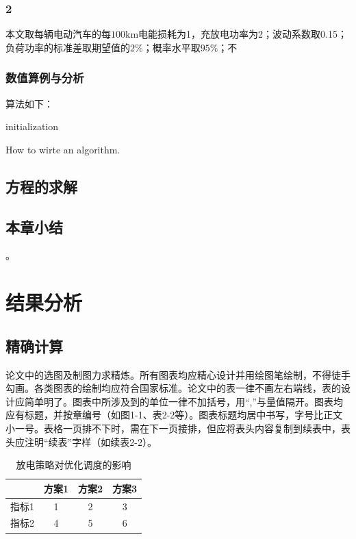 \documentclass[bachelor]{NCEPU-thesis}
\begin{document}
\subsection{2}
本文取每辆电动汽车的每$100$km电能损耗为1，充放电功率为2；波动系数取0.15；负荷功率的标准差取期望值的$2\%$；概率水平取$95\%$；不

\subsection{数值算例与分析}
算法如下：

\begin{algorithm}[H]
 initialization\;
 \caption{How to wirte an algorithm.}
\end{algorithm}


\section{方程的求解}

\section{本章小结}
。\chapter{结果分析}
\section{精确计算}

论文中的选图及制图力求精炼。所有图表均应精心设计并用绘图笔绘制，不得徒手勾画。各类图表的绘制均应符合国家标准。论文中的表一律不画左右端线，表的设计应简单明了。图表中所涉及到的单位一律不加括号，用“,”与量值隔开。图表均应有标题，并按章编号（如图1-1、表2-2等）。图表标题均居中书写，字号比正文小一号。表格一页排不下时，需在下一页接排，但应将表头内容复制到续表中，表头应注明“续表”字样（如续表2-2）。
\begin{table}[h]
\caption{放电策略对优化调度的影响}
\begin{tabular}{cccc}
    \toprule
          & 方案1   & 方案2   & 方案3 \\
    \midrule
    指标1   & 1     & 2     & 3 \\
    指标2   & 4     & 5     & 6 \\
    \bottomrule
    \end{tabular}%
\label{tablea}
\end{table}
\end{document}
